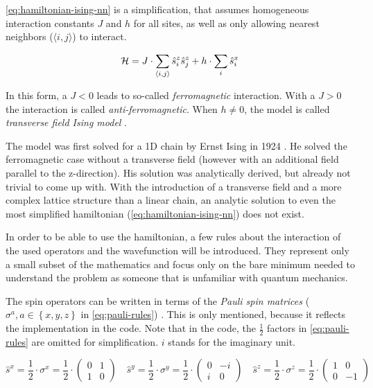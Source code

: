 \autoref{eq:hamiltonian-ising-nn} is a simplification, that assumes homogeneous interaction constants $J$ and $h$ for all sites, as well as only allowing nearest neighbors ($\langle i, j\rangle$) to interact.

\begin{equation}
    \label{eq:hamiltonian-ising-nn}
    \mathcal{H} =  J \cdot \sum\limits_{\langle i, j \rangle} \hat{s}^z_i \hat{s}^z_j + h \cdot \sum\limits_{i} \hat{s}^x_i
\end{equation}

In this form, a $J < 0$ leads to so-called \emph{ferromagnetic} interaction. With a $J > 0$ the interaction is called \emph{anti-ferromagnetic}. When $h \neq 0$, the model is called \emph{transverse field Ising model} \cite{isingBook}.

The model was first solved for a 1D chain by Ernst Ising in 1924 \cite{isingFerromagnetismn}. He solved the ferromagnetic case without a transverse field (however with an additional field parallel to the z-direction). His solution was analytically derived, but already not trivial to come up with.
With the introduction of a transverse field and a more complex lattice structure than a linear chain, an analytic solution to even the most simplified hamiltonian (\autoref{eq:hamiltonian-ising-nn}) does not exist.

In order to be able to use the hamiltonian, a few rules about the interaction of the used operators and the wavefunction will be introduced. They represent only a small subset of the mathematics and focus only on the bare minimum needed to understand the problem as someone that is unfamiliar with quantum mechanics. 

The spin operators can be written in terms of the \emph{Pauli spin matrices} ($\sigma^a, a \in \left\{x,y,z\right\}$ in \autoref{eq:pauli-rules}) \cite{schwablQM}. This is only mentioned, because it reflects the implementation in the code. Note that in the code, the $\frac{1}{2}$ factors in \autoref{eq:pauli-rules} are omitted for simplification. $i$ stands for the imaginary unit.

\begin{equation}
    \label{eq:pauli-rules}
    \hat{s}^x = \frac{1}{2} \cdot \sigma^x = \frac{1}{2} \cdot \left(\begin{matrix}
        0& 1 \\
        1& 0
    \end{matrix}\right) \quad
    \hat{s}^y = \frac{1}{2} \cdot \sigma^y = \frac{1}{2} \cdot \left(\begin{matrix}
        0& -i \\
        i& 0
    \end{matrix}\right) \quad
    \hat{s}^z = \frac{1}{2} \cdot \sigma^z = \frac{1}{2} \cdot \left(\begin{matrix}
        1& 0 \\
        0& -1
    \end{matrix}\right)
\end{equation}

